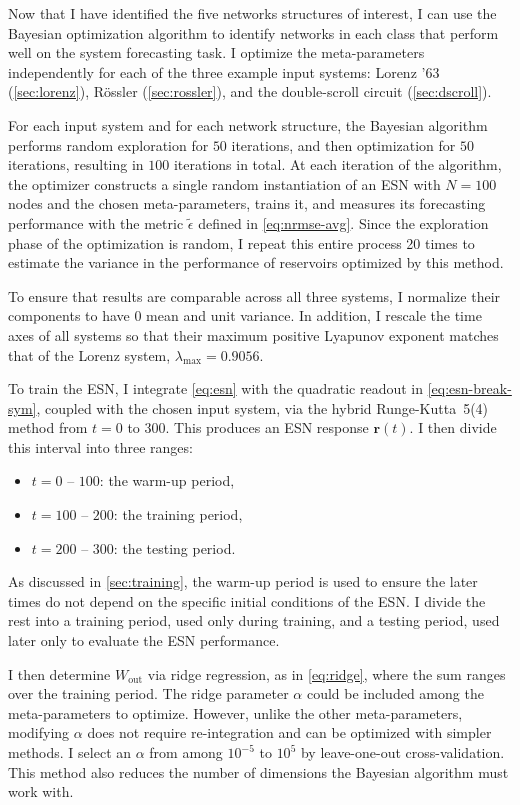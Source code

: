 Now that I have identified the five networks structures of interest, I
can use the Bayesian optimization algorithm to identify networks in
each class that perform well on the system forecasting task. I
optimize the meta-parameters independently for each of the three
example input systems: Lorenz '63 (\cref{sec:lorenz}), R{\"{o}}ssler
(\cref{sec:rossler}), and the double-scroll circuit
(\cref{sec:dscroll}).

For each input system and for each network structure, the Bayesian
algorithm performs random exploration for $50$ iterations, and then
optimization for $50$ iterations, resulting in $100$ iterations in
total. At each iteration of the algorithm, the optimizer constructs a
single random instantiation of an ESN with $N=100$ nodes and the chosen meta-parameters,
trains it, and measures its forecasting performance with the metric
$\tilde{\epsilon}$ defined in \cref{eq:nrmse-avg}. Since the
exploration phase of the optimization is random, I repeat this entire
process 20 times to estimate the variance in the performance of
reservoirs optimized by this method.

To ensure that results are comparable across all three systems, I
normalize their components to have $0$ mean and unit variance. In
addition, I rescale the time axes of all systems so that their maximum
positive Lyapunov exponent matches that of the Lorenz system,
$\lambda_\text{max} = 0.9056$.

To train the ESN, I integrate \cref{eq:esn} with the quadratic readout
in \cref{eq:esn-break-sym}, coupled with the chosen input system, via
the hybrid Runge-Kutta~5(4)~\cite{dormand1980} method from $t = 0$ to
$300$. This produces an ESN response $\bm{r}(t)$. I then divide this interval into three ranges:
\begin{itemize}
\item $t = 0$ -- $100$: the warm-up period,
\item $t = 100$ -- $200$: the training period,
\item $t = 200$ -- $300$: the testing period.
\end{itemize}
As discussed in \cref{sec:training}, the warm-up period is used to
ensure the later times do not depend on the specific initial
conditions of the ESN. I divide the rest into a training period, used
only during training, and a testing period, used later only to
evaluate the ESN performance.

I then determine $W_\text{out}$ via ridge regression, as in
\cref{eq:ridge}, where the sum ranges over the training period. The
ridge parameter $\alpha$ could be included among the meta-parameters to
optimize. However, unlike the other meta-parameters, modifying $\alpha$
does not require re-integration and can be optimized with simpler
methods. I select an $\alpha$ from among $10^{-5}$ to $10^5$ by
leave-one-out cross-validation. This method also reduces the number of
dimensions the Bayesian algorithm must work with.

